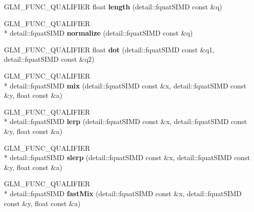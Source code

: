 \begin{DoxyCompactItemize}
\item 
\hypertarget{namespaceglm_aaa8b73fac4aaa2acdfc98adc48cd15d0}{G\-L\-M\-\_\-\-F\-U\-N\-C\-\_\-\-Q\-U\-A\-L\-I\-F\-I\-E\-R float {\bfseries length} (detail\-::fquat\-S\-I\-M\-D const \&q)}\label{namespaceglm_aaa8b73fac4aaa2acdfc98adc48cd15d0}

\item 
\hypertarget{namespaceglm_a31e71acc931a3619a3305958048cfa8d}{G\-L\-M\-\_\-\-F\-U\-N\-C\-\_\-\-Q\-U\-A\-L\-I\-F\-I\-E\-R \\*
detail\-::fquat\-S\-I\-M\-D {\bfseries normalize} (detail\-::fquat\-S\-I\-M\-D const \&q)}\label{namespaceglm_a31e71acc931a3619a3305958048cfa8d}

\item 
\hypertarget{namespaceglm_ab68375a7ad5f9dc3db97323af1326bbb}{G\-L\-M\-\_\-\-F\-U\-N\-C\-\_\-\-Q\-U\-A\-L\-I\-F\-I\-E\-R float {\bfseries dot} (detail\-::fquat\-S\-I\-M\-D const \&q1, detail\-::fquat\-S\-I\-M\-D const \&q2)}\label{namespaceglm_ab68375a7ad5f9dc3db97323af1326bbb}

\item 
\hypertarget{namespaceglm_a1539ad90a9eb88f535d9dfacba04c1c9}{G\-L\-M\-\_\-\-F\-U\-N\-C\-\_\-\-Q\-U\-A\-L\-I\-F\-I\-E\-R \\*
detail\-::fquat\-S\-I\-M\-D {\bfseries mix} (detail\-::fquat\-S\-I\-M\-D const \&x, detail\-::fquat\-S\-I\-M\-D const \&y, float const \&a)}\label{namespaceglm_a1539ad90a9eb88f535d9dfacba04c1c9}

\item 
\hypertarget{namespaceglm_a4d8cd3fe0165431fb1c54cbeb432bf26}{G\-L\-M\-\_\-\-F\-U\-N\-C\-\_\-\-Q\-U\-A\-L\-I\-F\-I\-E\-R \\*
detail\-::fquat\-S\-I\-M\-D {\bfseries lerp} (detail\-::fquat\-S\-I\-M\-D const \&x, detail\-::fquat\-S\-I\-M\-D const \&y, float const \&a)}\label{namespaceglm_a4d8cd3fe0165431fb1c54cbeb432bf26}

\item 
\hypertarget{namespaceglm_a40d5134f42aaa1511518d2abe97e0ebc}{G\-L\-M\-\_\-\-F\-U\-N\-C\-\_\-\-Q\-U\-A\-L\-I\-F\-I\-E\-R \\*
detail\-::fquat\-S\-I\-M\-D {\bfseries slerp} (detail\-::fquat\-S\-I\-M\-D const \&x, detail\-::fquat\-S\-I\-M\-D const \&y, float const \&a)}\label{namespaceglm_a40d5134f42aaa1511518d2abe97e0ebc}

\item 
\hypertarget{namespaceglm_acf0fe775efd8a75dc6dc603efd157231}{G\-L\-M\-\_\-\-F\-U\-N\-C\-\_\-\-Q\-U\-A\-L\-I\-F\-I\-E\-R \\*
detail\-::fquat\-S\-I\-M\-D {\bfseries fast\-Mix} (detail\-::fquat\-S\-I\-M\-D const \&x, detail\-::fquat\-S\-I\-M\-D const \&y, float const \&a)}\label{namespaceglm_acf0fe775efd8a75dc6dc603efd157231}


\end{DoxyCompactItemize}
